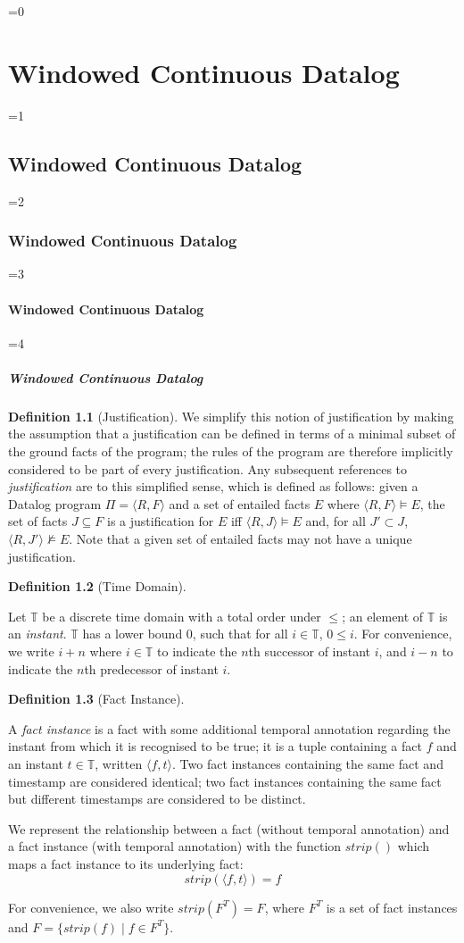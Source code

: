 \documentclass[twocolumn,preprint,3p,number]{elsarticle}
\theoremstyle{plain}
\theoremstyle{definition}
\newtheorem{definition}{Definition}
\newcounter{nestingdepth}
\newenvironment{nestedsection}[2]{
  \ifnum\value{nestingdepth}=0
    \chapter{#1}
  \else
    \ifnum\value{nestingdepth}=1
      \section{#1}
    \else
      \ifnum\value{nestingdepth}=2
        \subsection{#1}
      \else
        \ifnum\value{nestingdepth}=3
          \subsubsection{#1}
        \else
          \ifnum\value{nestingdepth}=4
            \paragraph{#1}
          \else
            \PackageError{nestedsections}{Maximum nesting level exceeded!}{uh oh!}
          \fi
        \fi
      \fi
    \fi
  \fi
  \addtocounter{nestingdepth}{1}
  \label{sec:#2}
}{\addtocounter{nestingdepth}{-1}}
\def\labeldef#1{\label{def:#1}}
\begin{document}
\begin{nestedsection}{Windowed Continuous Datalog}{semantics}
\begin{definition}[Justification]
We simplify this notion of justification by making the assumption that
a justification can be defined in terms of a minimal subset of the
ground facts of the program; the rules of the program are therefore
implicitly considered to be part of every justification. Any
subsequent references to {\em justification} are to this simplified
sense, which is defined as follows: given a Datalog program $\Pi =
\langle R, F \rangle$ and a set of entailed facts $E$ where $\langle
R, F \rangle \models E$, the set of facts $J \subseteq F$ is a
justification for $E$ iff $\langle R, J \rangle \models E$ and, for
all $J' \subset J$, $\langle R, J' \rangle \not\models E$. Note that a
given set of entailed facts may not have a unique justification.

\end{definition}

\begin{definition}[Time Domain]
\labeldef{continuous datalog: instant}

Let $\mathbb{T}$ be a discrete time domain with a total order under
$\leqslant$; an element of $\mathbb{T}$ is an {\em instant}.
$\mathbb{T}$ has a lower bound $0$, such that for all $i \in
\mathbb{T}$, $0 \leqslant i$. For convenience, we write $i+n$ where $i
\in \mathbb{T}$ to indicate the $n$th successor of instant $i$,
and $i-n$ to indicate the $n$th predecessor of instant $i$.

\end{definition}

\begin{definition}[Fact Instance]
 \labeldef{continuous datalog: fact instance}

A {\em fact instance} is a fact with some additional temporal
annotation regarding the instant from which it is recognised to be true;
it is a tuple containing a fact $f$ and an instant $t \in
\mathbb{T}$, written $\langle f, t \rangle$. Two fact instances
containing the same fact and timestamp are considered identical; two
fact instances containing the same fact but different timestamps are
considered to be distinct.

We represent the relationship between a fact (without temporal
annotation) and a fact instance (with temporal annotation) with the
function $strip()$ which maps a fact instance to its underlying fact:
\[ strip(\langle f, t\rangle) = f \]

For convenience, we also write $strip(F^T) = F$, where $F^T$ is a set
of fact instances and $F = \{ strip(f) \mid f \in F^T \}$.


\end{definition}
\end{nestedsection}
\end{document}

